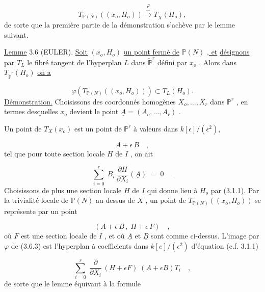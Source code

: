 \begin{equation}\tag{3.5.4}
T_{\mathbb{P}(N)}((x_o,H_o)) \overset{\varphi}{\overset{\sim}{\longrightarrow}} T_{\check{X}} (H_o) ,
\end{equation}
de sorte que la première partie de la démonstration s'achève par le lemme suivant.

\underline{Lemme} 3.6 (EULER). \underline{Soit} $(x_o, H_o)$ \underline{un point fermé de} $\mathbb{P}(N)$ \underline{, et} \underline{désignons par} $T_L$ \underline{le fibré tangent de l'hyperplan} $L$ \underline{dans} $\check{\mathbb{P}}^r$ \underline{défini par} $x_o$ . \underline{Alors dans} $T_{\check{\mathbb{P}}^r}(H_o)$ \underline{on a}

\begin{equation*}
\varphi (T_{\mathbb{P}(N)}((x_o, H_o))) \subset T_L(H_o) .
\end{equation*}
\underline{Démonstration.} Choisissons des coordonnés homogènes $X_o,\ldots,X_r$ dans $\mathbb{P}^r$ , en termes desquelles $x_o$ devient le point $\underline{A} = (A_o,\ldots,A_r)$ .



Un point de $T_X(x_o)$ est un point de $\mathbb{P}^r$ à valeurs dans $k[\epsilon]/(\epsilon^2)$,

\begin{equation}\tag{3.6.1}
\underline{A} + \epsilon \, \underline{B} \quad ,
\end{equation}
tel que pour toute section locale $H$ de $I$ , on ait

\begin{equation}\tag{3.6.2}
\sum_{i=0}^{r} \; B_i \, \frac{\partial H}{\partial X_i}(\underline{A}) \;=\; 0 \quad .
\end{equation}
Choisissons de plus une section locale $H$ de $I$ qui donne lieu à $H_o$ par (3.1.1). Par la trivialité locale de $\mathbb{P}(N)$ au-dessus de $X$ , un point de $T_{\mathbb{P}(N)}((x_o,H_o))$ se représente par un point

\begin{equation}\tag{3.6.3}
(\underline{A} + \epsilon \, \underline{B} \, , \; H + \epsilon \, F) \quad ,
\end{equation}
où $F$ est une section locale de $I$ , et où $\underline{A}$ et $\underline{B}$ sont comme ci-dessus. L'image par $\varphi$ de (3.6.3) est l'hyperplan à coefficients dans $k[e]/(\epsilon^2)$ d'équation (c.f. 3.1.1)

\begin{equation}\tag{3.6.4}
\sum_{i=0}^{r} \; \frac{\partial}{\partial X_i} \, (H+\epsilon F) \; (\underline{A}+\epsilon\underline{B})T_i \quad ,
\end{equation}
de sorte que le lemme équivaut à la formule

